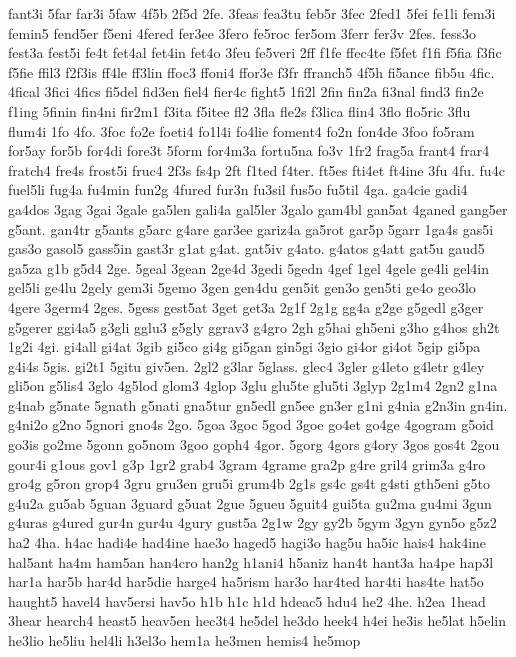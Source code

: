 {fant3i
5far
far3i
5faw
4f5b
2f5d
2fe.
3feas
fea3tu
feb5r
3fec
2fed1
5fei
fe1li
fem3i
femin5
fend5er
f5eni
4fered
fer3ee
3fero
fe5roc
fer5om
3ferr
fer3v
2fes.
fess3o
fest3a
fest5i
fe4t
fet4al
fet4in
fet4o
3feu
fe5veri
2ff
f1fe
ffec4te
f5fet
f1fi
f5fia
f3fic
f5fie
ffil3
f2f3is
ff4le
ff3lin
ffoc3
ffoni4
ffor3e
f3fr
ffranch5
4f5h
fi5ance
fib5u
4fic.
4fical
3fici
4fics
fi5del
fid3en
fiel4
fier4c
fight5
1fi2l
2fin
fin2a
fi3nal
find3
fin2e
f1ing
5finin
fin4ni
fir2m1
f3ita
f5itee
fl2
3fla
fle2s
f3lica
flin4
3flo
flo5ric
3flu
flum4i
1fo
4fo.
3foc
fo2e
foeti4
fo1l4i
fo4lie
foment4
fo2n
fon4de
3foo
fo5ram
for5ay
for5b
for4di
fore3t
5form
for4m3a
fortu5na
fo3v
1fr2
frag5a
frant4
frar4
fratch4
fre4s
frost5i
fruc4
2f3s
fs4p
2ft
f1ted
f4ter.
ft5es
fti4et
ft4ine
3fu
4fu.
fu4c
fuel5li
fug4a
fu4min
fun2g
4fured
fur3n
fu3sil
fus5o
fu5til
4ga.
ga4cie
gadi4
ga4dos
3gag
3gai
3gale
ga5len
gali4a
gal5ler
3galo
gam4bl
gan5at
4ganed
gang5er
g5ant.
gan4tr
g5ants
g5arc
g4are
gar3ee
gariz4a
ga5rot
gar5p
5garr
1ga4s
gas5i
gas3o
gasol5
gass5in
gast3r
g1at
g4at.
gat5iv
g4ato.
g4atos
g4att
gat5u
gaud5
ga5za
g1b
g5d4
2ge.
5geal
3gean
2ge4d
3gedi
5gedn
4gef
1gel
4gele
ge4li
gel4in
gel5li
ge4lu
2gely
gem3i
5gemo
3gen
gen4du
gen5it
gen3o
gen5ti
ge4o
geo3lo
4gere
3germ4
2ges.
5gess
gest5at
3get
get3a
2g1f
2g1g
gg4a
g2ge
g5gedl
g3ger
g5gerer
ggi4a5
g3gli
gglu3
g5gly
ggrav3
g4gro
2gh
g5hai
gh5eni
g3ho
g4hos
gh2t
1g2i
4gi.
gi4all
gi4at
3gib
gi5co
gi4g
gi5gan
gin5gi
3gio
gi4or
gi4ot
5gip
gi5pa
g4i4s
5gis.
gi2t1
5gitu
giv5en.
2gl2
g3lar
5glass.
glec4
3gler
g4leto
g4letr
g4ley
gli5on
g5lis4
3glo
4g5lod
glom3
4glop
3glu
glu5te
glu5ti
3glyp
2g1m4
2gn2
g1na
g4nab
g5nate
5gnath
g5nati
gna5tur
gn5edl
gn5ee
gn3er
g1ni
g4nia
g2n3in
gn4in.
g4ni2o
g2no
5gnori
gno4s
2go.
5goa
3goc
5god
3goe
go4et
go4ge
4gogram
g5oid
go3is
go2me
5gonn
go5nom
3goo
goph4
4gor.
5gorg
4gors
g4ory
3gos
gos4t
2gou
gour4i
g1ous
gov1
g3p
1gr2
grab4
3gram
4grame
gra2p
g4re
gril4
grim3a
g4ro
gro4g
g5ron
grop4
3gru
gru3en
gru5i
grum4b
2g1s
gs4c
gs4t
g4sti
gth5eni
g5to
g4u2a
gu5ab
5guan
3guard
g5uat
2gue
5gueu
5guit4
gui5ta
gu2ma
gu4mi
3gun
g4uras
g4ured
gur4n
gur4u
4gury
gust5a
2g1w
2gy
gy2b
5gym
3gyn
gyn5o
g5z2
ha2
4ha.
h4ac
hadi4e
had4ine
hae3o
haged5
hagi3o
hag5u
ha5ic
hais4
hak4ine
hal5ant
ha4m
ham5an
han4cro
han2g
h1ani4
h5aniz
han4t
hant3a
ha4pe
hap3l
har1a
har5b
har4d
har5die
harge4
ha5rism
har3o
har4ted
har4ti
has4te
hat5o
haught5
havel4
hav5ersi
hav5o
h1b
h1c
h1d
hdeac5
hdu4
he2
4he.
h2ea
1head
3hear
hearch4
heast5
heav5en
hec3t4
he5del
he3do
heek4
h4ei
he3is
he5lat
h5elin
he3lio
he5liu
hel4li
h3el3o
hem1a
he3men
hemis4
he5mop
}
